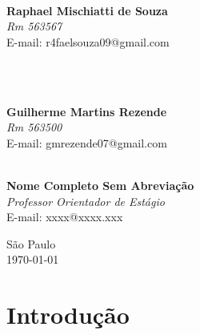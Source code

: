 \documentclass{tcc}
\begin{document}
\vspace{1.5cm}

\begin{center}    
\begin{minipage}[t]{0.4\textwidth}
    \hrulefill \\
    \centering
    \textbf{Raphael Mischiatti de Souza} \\
    \textit{Rm 563567} \\
    E-mail: r4faelsouza09@gmail.com \\
    \vspace{3cm}
\end{minipage}
\hfill
\\
\begin{minipage}[t]{0.4\textwidth}
    \hrulefill \\
    \centering
    \textbf{Guilherme Martins Rezende} \\
    \textit{Rm 563500} \\
    E-mail: gmrezende07@gmail.com \\
    \vspace{3cm}
\end{minipage}


\begin{minipage}[t]{0.4\textwidth}
    \hrulefill \\
    \centering
    \textbf{Nome Completo Sem Abreviação} \\
    \textit{Professor Orientador de Estágio} \\
    E-mail: xxxx@xxxx.xxx \\
    \vspace{3cm}
\end{minipage}
\end{center}

\vfill

\begin{center}
    São Paulo \\
    \today
\end{center}

\newpage

\tableofcontents
\newpage

\section{Introdução}
\end{document}
